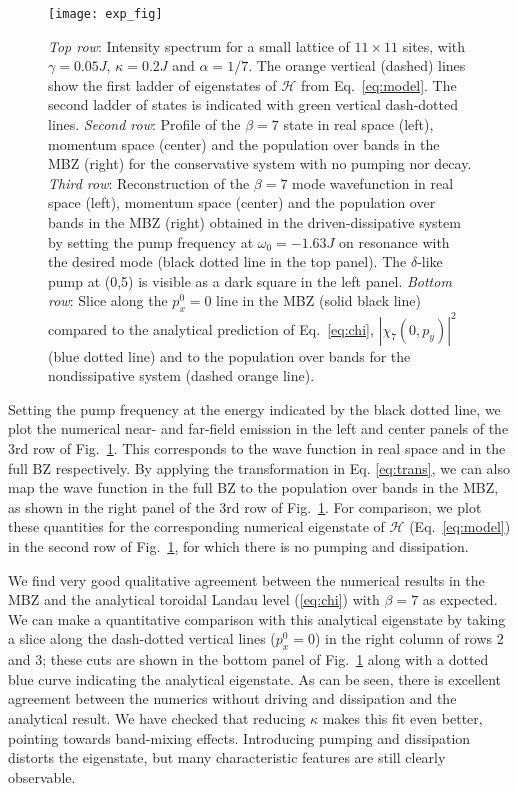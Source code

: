 \begin{figure}[tb]
  \centering
  \texttt{[image: exp\_fig]} %
  \caption{\emph{Top row}: Intensity spectrum for a small lattice of $11 \times 11$ sites, with
    $\gamma = 0.05 J$, $\kappa = 0.2 J$ and $\alpha=1/7$. The orange vertical (dashed) lines
    show the first ladder of eigenstates of $\mathcal{H}$ from Eq.~\eqref{eq:model}. The second ladder of states is indicated with green vertical dash-dotted lines.
  \emph{Second row}: Profile of the $\beta=7$ state in real space
    (left), momentum space (center) and the population over bands in the MBZ (right) for the conservative system with no pumping nor decay.
    \emph{Third row}: Reconstruction of the $\beta=7$ mode wavefunction in real space (left), momentum space (center) and the population over bands in the MBZ (right) obtained in the driven-dissipative system by setting the pump frequency at $\omega_0 = -1.63 J$ on resonance with the desired mode (black dotted line in the top panel).
The $\delta$-like pump at (0,5) is visible as a dark square in the left panel.
    \emph{Bottom row}: Slice along the $p_x^0 = 0$ line in the MBZ
    (solid black line) compared to the analytical prediction of
    Eq.~\eqref{eq:chi}, $|\chi_7(0,p_y)|^2$ (blue dotted line) and to the population over bands for the nondissipative system (dashed orange line).}
  \label{fig:exp}
\end{figure}


Setting the pump frequency at the energy indicated by the black dotted
line, we plot the numerical near- and far-field emission in the left and center panels of the 3rd row of Fig.~\ref{fig:exp}. This corresponds to 
the wave function in real space and in the full
BZ respectively. By applying the transformation in Eq. \ref{eq:trans}, we can also map the wave function in the full BZ to the population over bands in the MBZ, as shown in the right panel of the 3rd row of Fig.~\ref{fig:exp}. For comparison, we plot these
quantities for the corresponding numerical eigenstate of $\mathcal{H}$ (Eq.~\eqref{eq:model})
in the second row of Fig.~\ref{fig:exp}, for which there is no pumping and dissipation. 

We find very good qualitative agreement between the numerical results in the MBZ and the analytical toroidal Landau level (\ref{eq:chi}) with $\beta=7$ as expected. We can make a quantitative comparison with this analytical eigenstate by taking
a slice along the dash-dotted vertical lines ($p_x^0 = 0$) in the
right column of rows 2 and 3; these cuts are shown in the bottom panel of Fig.~\ref{fig:exp} along with a dotted blue curve indicating the analytical eigenstate. As can be seen, there is excellent agreement between the numerics without driving and dissipation and the analytical result. We have checked that reducing $\kappa$ makes this fit even better, pointing towards band-mixing effects. Introducing pumping and dissipation distorts the eigenstate, but many characteristic features are still clearly observable. 

